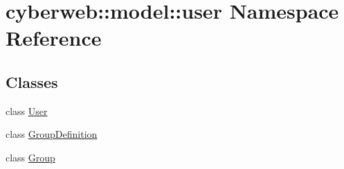 \hypertarget{namespacecyberweb_1_1model_1_1user}{\section{cyberweb\-:\-:model\-:\-:user \-Namespace \-Reference}
\label{namespacecyberweb_1_1model_1_1user}
}
\subsection*{\-Classes}
\begin{DoxyCompactItemize}
\item 
class \hyperlink{classcyberweb_1_1model_1_1user_1_1_user}{\-User}
\item 
class \hyperlink{classcyberweb_1_1model_1_1user_1_1_group_definition}{\-Group\-Definition}
\item 
class \hyperlink{classcyberweb_1_1model_1_1user_1_1_group}{\-Group}
\end{DoxyCompactItemize}
